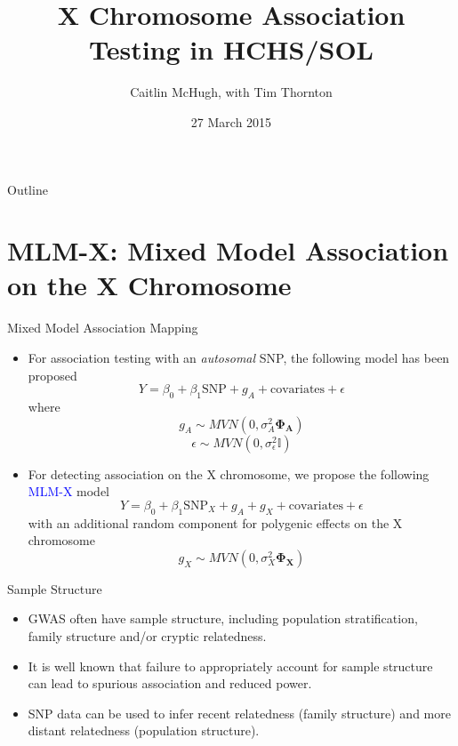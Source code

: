 \documentclass{beamer}
\title[X Chromosome Association Testing in HCHS/SOL] %
{X Chromosome Association Testing in HCHS/SOL}
\author[Caitlin McHugh, with Tim Thornton] %
{Caitlin McHugh, with Tim Thornton}
\institute[University of Washington] %
{
  Department of Biostatistics\\
  University of Washington
}
\date[Short Occasion] %
{27 March 2015}
\begin{document}
\begin{frame}
  \titlepage
\end{frame}

\begin{frame}{Outline}
\tableofcontents
\end{frame}

\section{MLM-X: Mixed Model Association on the X Chromosome}
\begin{frame}{Mixed Model Association Mapping}
\begin{itemize}
\item For association testing with an \textit{autosomal} SNP, the following model has been proposed
\begin{equation} Y = \beta_0 + \beta_1 \mbox{SNP} + g_A + \mbox{covariates} +\epsilon
\end{equation} where
$$ g_A \sim MVN(0,\sigma_A^2 \mathbf{\Phi_A})$$
$$ \epsilon \sim MVN(0,\sigma_\epsilon^2 \mathbb{I})$$
\item For detecting association on the X chromosome, we propose the following \textcolor{blue}{MLM-X} model
\begin{equation}
 Y = \beta_0 + \beta_1 \mbox{SNP}_X + g_A + g_X + \mbox{covariates} +\epsilon
\end{equation} with an additional random component for polygenic effects on the X chromosome
$$ g_X \sim MVN(0,\sigma_X^2 \mathbf{\Phi_X})$$
\end{itemize}
\end{frame}

\begin{frame}{Sample Structure}
\begin{itemize}
\item GWAS often have sample structure, including population stratification, family structure and/or cryptic relatedness.
\item It is well known that failure to appropriately account for sample structure can lead to spurious association and reduced power.
\item SNP data can be used to infer recent relatedness (family structure) and more distant relatedness (population structure).
\end{itemize}
\end{frame}
\end{document}
